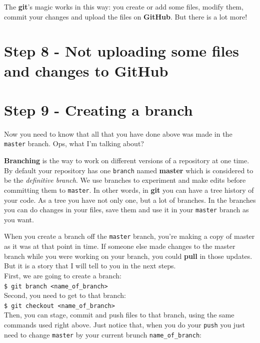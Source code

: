 \documentclass[12pt,a4paper,titlepage,brazil]{article}
\begin{document}
{The {\bf git}'s magic works in this way: you create or add some files, modify them, commit your changes and upload the files on {\bf GitHub}. But there is a lot more!


\section{Step 8 - Not uploading some files and changes to GitHub}


\section{Step 9 - Creating a branch}

Now you need to know that all that you have done above was made in the \texttt{master} branch. Ops, what I'm talking about?

{\bf Branching} is the way to work on different versions of a repository at one time. By default your repository has one \texttt{branch} named {\bf master} which is considered to be the {\em definitive branch}. We use branches to experiment and make edits before committing them to \texttt{master}. In other words, in {\bf git} you can have a tree history of your code. As a tree you have not only one, but a lot of branches. In the branches you can do changes in your files, save them and use it in your \texttt{master} branch as you want.

When you create a branch off the \texttt{master} branch, you’re making a copy of master as it was at that point in time. If someone else made changes to the master branch while you were working on your branch, you could {\bf pull} in those updates. But it is a story that I will tell to you in the next steps.\\

First, we are going to create a branch:\\

\texttt{\$ git branch <name\_of\_branch>}\\

Second, you need to get to that branch:\\

\texttt{\$ git checkout <name\_of\_branch>}\\

Then, you can stage, commit and push files to that branch, using the same commands used right above. Just notice that, when you do your \texttt{push} you just need to change \texttt{master} by your current brunch \texttt{name\_of\_branch}:\\

}
\end{document}
